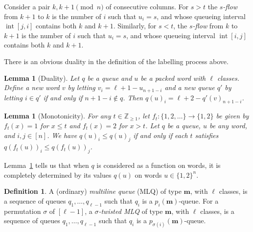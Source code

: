 \documentclass[reqno]{amsart}
\newcommand{\0}{\phantom{c}}
\DeclareMathOperator{\inter}{int} %
\newcommand{\mm}{\mathbf{m}}
\newcommand{\ZZ}{\mathbb{Z}}
\newcommand{\ive}[1]{\left[ #1 \right]}
\newcommand{\defn}[1]{{\color{darkred}\emph{#1}}} %
\theoremstyle{plain}
\newtheorem{lemma}[thm]{Lemma}
\theoremstyle{definition}
\newtheorem{dfn}[thm]{Definition}
\newtheorem{remark}[thm]{Remark}
\numberwithin{equation}{section}
\begin{document}
Consider a pair $k, k+1 \pmod{n}$ of consecutive columns.
For $s > t$ the \defn{$s$-flow} from $k+1$ to $k$ is the number of $i$ such that $u_i=s$, and whose queueing interval $\inter[j,i]$ contains both $k$ and $k+1$.
Similarly, for $s < t$, the \defn{$s$-flow} from $k$ to $k+1$ is the number of $i$ such that $u_i = s$, and whose queueing interval $\inter[i,j]$ contains both $k$ and $k+1$.

There is an obvious duality in the definition of the labelling process above.

\begin{lemma}[Duality]
  \label{le:dual}
  Let $q$ be a queue and $u$ be a packed word with $\ell$ classes.
  Define a new word $v$ by letting $v_i = \ell + 1 - u_{n+1-i}$ and a new queue $q'$ by letting $i \in q'$ if and only if $n+1-i \notin q$.
 Then $q(u)_i = \ell + 2 - q'(v)_{n+1-i}$.
\end{lemma}


\begin{lemma}[Monotonicity]
\label{le:mono}
  For any $t \in \ZZ_{\geq 1}$, let $f_t \colon \{1,2, \ldots\} \to \{1,2\}$ be given by $f_t(x) = 1$ for $x \leq t$ and $f_t(x) = 2$ for $x > t$.
  Let $q$ be a queue, $u$ be any word, and $i,j \in \ive{n}$.
  We have $q(u)_i \leq q(u)_j$ if and only if each $t$ satisfies $q(f_t(u))_i \leq q(f_t(u))_j$.
\end{lemma}

Lemma~\ref{le:mono} tells us that when $q$ is considered as a function on words, it is completely determined by its values $q(u)$ on words $u \in \{1,2\}^n$.

\begin{dfn}
A (ordinary) \defn{multiline queue} (MLQ) of type $\mm$, with $\ell$ classes, is a sequence of queues $q_1, \dotsc, q_{\ell-1}$ such that $q_i$ is a $p_i(\mm)$-queue.
For a permutation $\sigma$ of $\ive{\ell-1}$, a \defn{$\sigma$-twisted MLQ} of type $\mm$, with $\ell$ classes, is a sequence of queues $q_1, \dotsc, q_{\ell-1}$ such that $q_i$ is a $p_{\sigma(i)}(\mm)$-queue.
\end{dfn}
\end{document}
